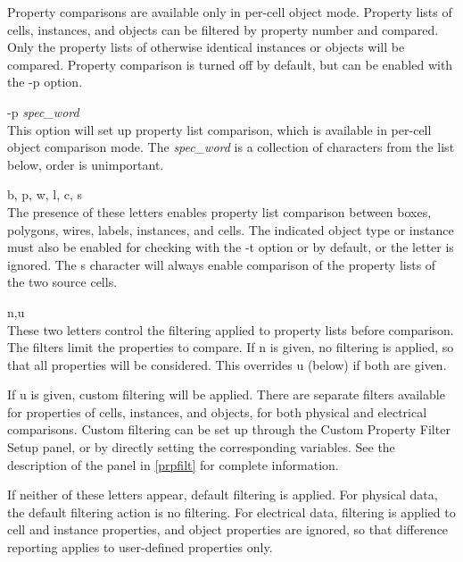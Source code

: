 Property comparisons are available only in per-cell object mode. 
Property lists of cells, instances, and objects can be filtered by
property number and compared.  Only the property lists of otherwise
identical instances or objects will be compared.  Property comparison
is turned off by default, but can be enabled with the {\vt -p} option.

\begin{description}
\item{{\vt -p} {\it spec\_word}}\\
This option will set up property list comparison, which is available
in per-cell object comparison mode.  The {\it spec\_word} is a
collection of characters from the list below, order is unimportant.

\begin{description}
\item{\vt b, p, w, l, c, s}\\
The presence of these letters enables property list comparison between
boxes, polygons, wires, labels, instances, and cells.  The indicated
object type or instance must also be enabled for checking with the
{\vt -t} option or by default, or the letter is ignored.  The {\vt s}
character will always enable comparison of the property lists of the
two source cells.

\item{\vt n,u}\\
These two letters control the filtering applied to property lists
before comparison.  The filters limit the properties to compare.  If
{\vt n} is given, no filtering is applied, so that all properties will
be considered.  This overrides {\vt u} (below) if both are given.

If {\vt u} is given, custom filtering will be applied.  There are
separate filters available for properties of cells, instances, and
objects, for both physical and electrical comparisons.  Custom
filtering can be set up through the {\cb Custom Property Filter Setup}
panel, or by directly setting the corresponding variables.  See the
description of the panel in \ref{prpfilt} for complete information.

If neither of these letters appear, default filtering is applied.  For
physical data, the default filtering action is no filtering.  For
electrical data, filtering is applied to cell and instance properties,
and object properties are ignored, so that difference reporting
applies to user-defined properties only.
\end{description}
\end{description}

